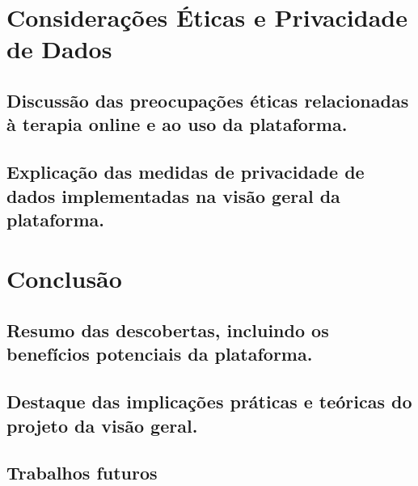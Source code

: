 \section{Considerações Éticas e Privacidade de Dados}
\subsection{Discussão das preocupações éticas relacionadas à terapia online e ao uso da plataforma.}
\subsection{Explicação das medidas de privacidade de dados implementadas na visão geral da plataforma.}
\section{Conclusão}
\subsection{Resumo das descobertas, incluindo os benefícios potenciais da plataforma.}
\subsection{Destaque das implicações práticas e teóricas do projeto da visão geral.}
\subsection{Trabalhos futuros}




